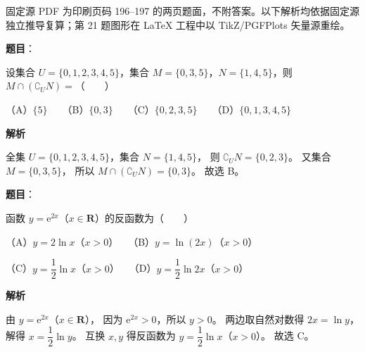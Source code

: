 

\begin{gktip}
固定源 PDF 为印刷页码 196–197 的两页题面，不附答案。以下解析均依据固定源独立推导复算；第 21 题图形在 LaTeX 工程中以 TikZ/PGFPlots 矢量源重绘。
\end{gktip}

\begin{answer}

\textbf{题目}：

设集合 $U=\{0,1,2,3,4,5\}$，集合 $M=\{0,3,5\}$，$N=\{1,4,5\}$，则 $M\cap(\complement_U N)=$\mbox{（　　）}

（A）$\{5\}$　　（B）$\{0,3\}$　　（C）$\{0,2,3,5\}$　　（D）$\{0,1,3,4,5\}$

\textbf{解析}

全集 $U=\{0,1,2,3,4,5\}$，集合 $N=\{1,4,5\}$，
则 $\complement_U N=\{0,2,3\}$。
又集合 $M=\{0,3,5\}$，
所以 $M\cap(\complement_U N)=\{0,3\}$。
故选 B。


\end{answer}
\begin{answer}

\textbf{题目}：

函数 $y=\mathrm{e}^{2x}$（$x\in\mathbf{R}$）的反函数为\mbox{（　　）}

（A）$y=2\ln x$（$x>0$）　　（B）$y=\ln(2x)$（$x>0$）

（C）$y=\dfrac{1}{2}\ln x$（$x>0$）　　（D）$y=\dfrac{1}{2}\ln 2x$（$x>0$）

\textbf{解析}

由 $y=\mathrm{e}^{2x}$（$x\in\mathbf{R}$），
因为 $\mathrm{e}^{2x}>0$，所以 $y>0$。
两边取自然对数得 $2x=\ln y$，解得 $x=\dfrac{1}{2}\ln y$。
互换 $x,y$ 得反函数为 $y=\dfrac{1}{2}\ln x$（$x>0$）。
故选 C。


\end{answer}
